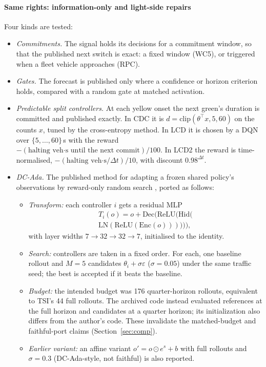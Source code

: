 \paragraph{Same rights: information-only and light-side repairs} Four kinds are tested:
\begin{itemize}\setlength\itemsep{1pt}
\item \emph{Commitments.} The signal holds its decisions for a commitment window, so that the published next switch is exact: a fixed
window (WC5), or triggered when a fleet vehicle approaches (RPC).
\item \emph{Gates.} The forecast is published only where a confidence or horizon criterion holds, compared with a random gate at matched
activation.
\item \emph{Predictable split controllers.} At each yellow onset the next green's duration is committed and published exactly. In CDC it
is $d=\mathrm{clip}(\theta^\top x,5,60)$ on the counts $x$, tuned by the cross-entropy method. In LCD it is chosen by a DQN over
$\{5,\dots,60\}$\,s with the reward $-(\text{halting veh·s until the next commit})/100$. In LCD2 the reward is time-normalised,
$-(\text{halting veh·s}/\Delta t)/10$, with discount $0.98^{\Delta t}$.
\item \emph{DC-Ada.} The published method for adapting a frozen shared policy's observations by reward-only random search
\cite{alqithami2026}, ported as follows:
\begin{itemize}\setlength\itemsep{0pt}
\item \emph{Transform:} each controller $i$ gets a residual MLP
\begin{multline*}T_i(o)=o+\mathrm{Dec}\big(\mathrm{ReLU}(\mathrm{Hid}(\\\mathrm{LN}(\mathrm{ReLU}(\mathrm{Enc}(o)))))\big),\end{multline*}
with layer widths $7\to32\to32\to7$, initialised to the identity.
\item \emph{Search:} controllers are taken in a fixed order. For each, one baseline rollout and $M=5$ candidates
$\theta_i+\sigma\varepsilon$ ($\sigma=0.05$) under the same traffic seed; the best is accepted if it beats the baseline.
\item \emph{Budget:} the intended budget was 176 quarter-horizon rollouts, equivalent to TSI's 44 full rollouts. The archived code instead evaluated references at the full horizon and candidates at a quarter horizon; its initialization also differs from the author's code. These invalidate the matched-budget and faithful-port claims (Section~\ref{sec:comp}).
\item \emph{Earlier variant:} an affine variant $o'=o\odot e^{s}+b$ with full rollouts and $\sigma=0.3$ (DC-Ada-style, not faithful) is
also reported.
\end{itemize}
\end{itemize}

